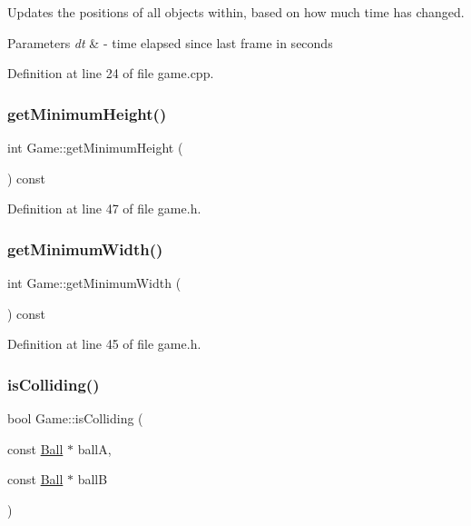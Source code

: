 Updates the positions of all objects within, based on how much time has changed. 


\begin{DoxyParams}{Parameters}
{\em dt} & -\/ time elapsed since last frame in seconds \\
\hline
\end{DoxyParams}


Definition at line 24 of file game.\+cpp.

\mbox{\label{class_game_a0712183d4b571d7e3aeb60745b597abd}} 
\subsubsection{\texorpdfstring{get\+Minimum\+Height()}{getMinimumHeight()}}
{\footnotesize\ttfamily int Game\+::get\+Minimum\+Height (\begin{DoxyParamCaption}{ }\end{DoxyParamCaption}) const\hspace{0.3cm}{\ttfamily [inline]}}



Definition at line 47 of file game.\+h.

\mbox{\label{class_game_a0eee5d6dca8985da6e57bd548214a507}} 
\subsubsection{\texorpdfstring{get\+Minimum\+Width()}{getMinimumWidth()}}
{\footnotesize\ttfamily int Game\+::get\+Minimum\+Width (\begin{DoxyParamCaption}{ }\end{DoxyParamCaption}) const\hspace{0.3cm}{\ttfamily [inline]}}



Definition at line 45 of file game.\+h.

\mbox{\label{class_game_ac574803a4cd9cb5f52f72268c5f22b40}} 
\subsubsection{\texorpdfstring{is\+Colliding()}{isColliding()}}
{\footnotesize\ttfamily bool Game\+::is\+Colliding (\begin{DoxyParamCaption}\item[{const \mbox{\hyperlink{class_ball}{Ball}} $\ast$}]{ballA,  }\item[{const \mbox{\hyperlink{class_ball}{Ball}} $\ast$}]{ballB }\end{DoxyParamCaption})\hspace{0.3cm}{\ttfamily [inline]}}



